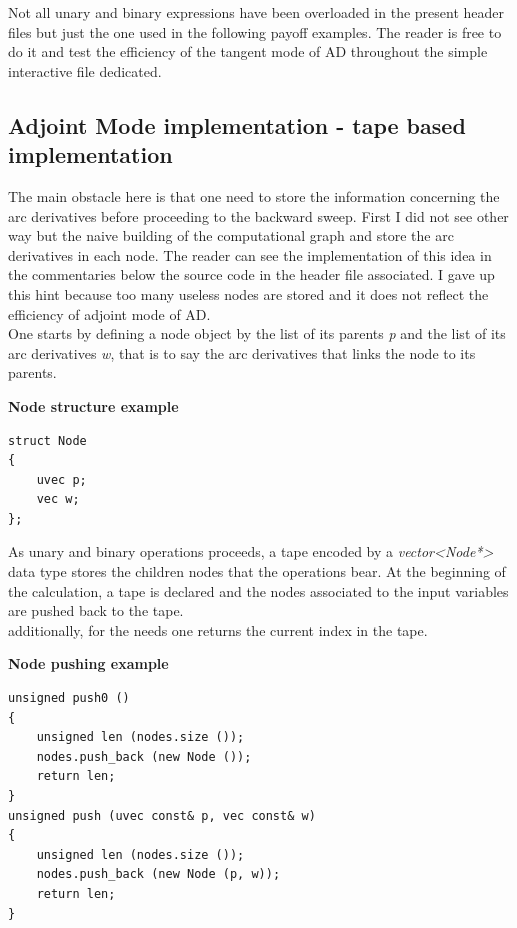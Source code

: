 \documentclass {article}
\begin{document}
Not all unary and binary expressions have been overloaded in the present header files but just the one used in the following payoff examples. 
The reader is free to do it and test the efficiency of the tangent mode of AD throughout the simple interactive file dedicated.

		\subsection {Adjoint Mode implementation - tape based implementation}
		
			The main obstacle here is that one need to store the information concerning the arc derivatives before proceeding to the backward sweep.
			First I did not see other way but the naive building of the computational graph and store the arc derivatives in each node. 
			The reader can see the implementation of this idea in the commentaries below the source code in the header file associated.
			I gave up this hint because too many useless nodes are stored and it does not reflect the efficiency of adjoint mode of AD. \\
			One starts by defining a node object by the list of its parents \textit{p} and the list of its arc derivatives \textit{w}, that is to say the arc derivatives that links the node to its parents.
			
			\begin{frameth}
				\textbf{Node structure example}
\begin{lstlisting}		
struct Node
{
	uvec p; 
	vec w;
};
\end{lstlisting}
			\end{frameth}
			
			As unary and binary operations proceeds, a tape encoded by a \textit{vector<Node*>} data type stores the children nodes that the operations bear.
			At the beginning of the calculation, a tape is declared and the nodes associated to the input variables are pushed back to the tape. \\
			additionally, for the needs one returns the current index in the tape.

			\newpage

			\begin{frameth}
				\textbf{Node pushing example}
\begin{lstlisting}		
unsigned push0 ()
{
	unsigned len (nodes.size ());
	nodes.push_back (new Node ());
	return len;
}
unsigned push (uvec const& p, vec const& w)
{
	unsigned len (nodes.size ());
	nodes.push_back (new Node (p, w));
	return len;
}
\end{lstlisting}
			\end{frameth}
			
\end{document}
